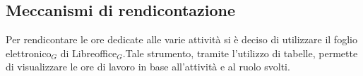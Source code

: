 \subsection{Meccanismi di rendicontazione}
Per rendicontare le ore dedicate alle varie attività si è deciso di utilizzare il foglio elettronico$_G$ di Libreoffice$_G$.Tale strumento, tramite l'utilizzo di tabelle, permette di visualizzare le ore di lavoro in base all'attività e al ruolo svolti.

\newpage